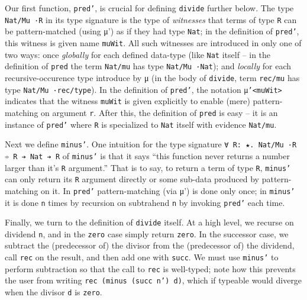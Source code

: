 \documentclass{article}
\begin{document}
Our first function, \texttt{pred'}, is crucial for defining \texttt{divide} further
below. The type \texttt{Nat/Mu ·R} in its type signature is the type of
\textit{witnesses} that terms of type \texttt{R} can be pattern-matched (using μ')
as if they had type \texttt{Nat}; in the definition of \texttt{pred'}, this witness
is given name \texttt{muWit}. All such witnesses are introduced in only one of
two ways: once \textit{globally} for each defined data-type (like \texttt{Nat}
itself -- in the definition of \texttt{pred} the term \texttt{Nat/mu} has type
\texttt{Nat/Mu ·Nat}); and \textit{locally} for each recursive-occurence type
introduce by μ (in the body of \texttt{divide}, term \texttt{rec/mu} has type
\texttt{Nat/Mu ·rec/type}). In the definition of \texttt{pred'}, the notation
\texttt{μ'<muWit>} indicates that the witness \texttt{muWit} is given explicitly
to enable (mere) pattern-matching on argument \texttt{r}. After this, the
definition of \texttt{pred} is easy -- it is an instance of \texttt{pred'} where
\texttt{R} is specialized to \texttt{Nat} itself with evidence \texttt{Nat/mu}.

Next we define \texttt{minus'}. One intuition for the type signature \texttt{∀
  R: ★. Nat/Mu ·R ➾ R ➔ Nat ➔ R} of
\texttt{minus'} is that it says ``this function never returns a number larger
than it's \texttt{R} argument.'' That is to say, to
return a term of type \texttt{R}, \texttt{minus'} can only return its \texttt{R}
argument directly or some sub-data produced by pattern-matching on it. In
\texttt{pred'} pattern-matching (via μ') is done only once; in \texttt{minus'} it is done \texttt{n}
times by recursion on subtrahend \texttt{n} by invoking \texttt{pred'} each time.

Finally, we turn to the definition of \texttt{divide} itself. At a high level,
we recurse on dividend \texttt{n}, and in the \texttt{zero} case simply return
\texttt{zero}. In the successor case, we subtract the (predecessor of) the
divisor from the (predecessor of) the dividend, call \texttt{rec} on the result,
and then add one with \texttt{succ}. We must use \texttt{minus'} to perform
subtraction so that the call to \texttt{rec} is well-typed; note how this 
prevents the user from writing \texttt{rec (minus (succ n') d)}, which if
typeable would diverge when the divisor \texttt{d} is \texttt{zero}.
\end{document}
